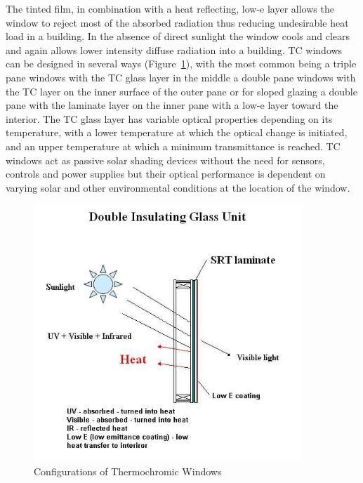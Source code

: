 The tinted film, in combination with a heat reflecting, low-e layer allows the window to reject most of the absorbed radiation thus reducing undesirable heat load in a building. In the absence of direct sunlight the window cools and clears and again allows lower intensity diffuse radiation into a building. TC windows can be designed in several ways (Figure~\ref{fig:configurations-of-thermochromic-windows}), with the most common being a triple pane windows with the TC glass layer in the middle a double pane windows with the TC layer on the inner surface of the outer pane or for sloped glazing a double pane with the laminate layer on the inner pane with a low-e layer toward the interior. The TC glass layer has variable optical properties depending on its temperature, with a lower temperature at which the optical change is initiated, and an upper temperature at which a minimum transmittance is reached. TC windows act as passive solar shading devices without the need for sensors, controls and power supplies but their optical performance is dependent on varying solar and other environmental conditions at the location of the window.

\begin{figure}[hbtp] %
\centering
\includegraphics[width=0.9\textwidth, height=0.9\textheight, keepaspectratio=true]{media/image1017.png}
\caption{Configurations of Thermochromic Windows \protect \label{fig:configurations-of-thermochromic-windows}}
\end{figure}

